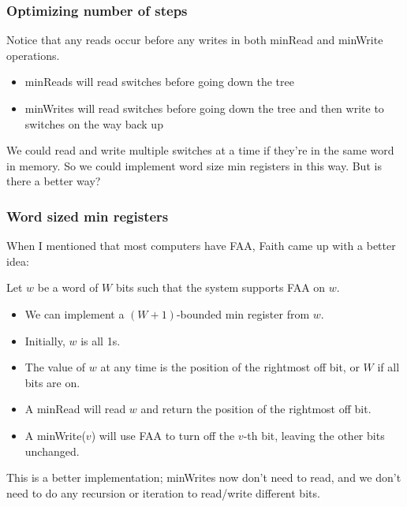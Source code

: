 \documentclass{beamer}
\begin{document}
\begin{frame}
	\frametitle{Optimizing number of steps}
	Notice that any reads occur before any writes in both minRead and minWrite operations.
	\begin{itemize}
		\item minReads will read switches before going down the tree
		\item minWrites will read switches before going down the tree and then write to switches on the way back up
	\end{itemize}
	We could read and write multiple switches at a time if they're in the same word in memory.
	So we could implement word size min registers in this way. But is there a better way?
\end{frame}

\begin{frame}
	\frametitle{Word sized min registers}
	When I mentioned that most computers have FAA, Faith came up with a better idea:

	Let $w$ be a word of $W$ bits such that the system supports FAA on $w$.
	\begin{itemize}
		\item We can implement a $(W+1)$-bounded min register from $w$.
		\item Initially, $w$ is all 1s.
		\item The value of $w$ at any time is the position of the rightmost off bit, or $W$ if all bits are on.
		\item A minRead will read $w$ and return the position of the rightmost off bit.
		\item A minWrite($v$) will use FAA to turn off the $v$-th bit, leaving the other bits unchanged.
	\end{itemize}
	This is a better implementation; minWrites now don't need to read, and we don't need to do any recursion or iteration to read/write 
	different bits.
\end{frame}
\end{document}
